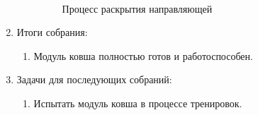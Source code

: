 \begin{enumerate}
\begin{enumerate}
\begin{figure}[H]
\begin{minipage}[h]{0.24\linewidth}
			\end{minipage}
			\caption{Процесс раскрытия направляющей}
		\end{figure}

	\end{enumerate}
	
	\item Итоги собрания:
	\begin{enumerate}
		
		\item Модуль ковша полностью готов и работоспособен.
		
	\end{enumerate}
	
	\item Задачи для последующих собраний:
	\begin{enumerate}
		
		\item Испытать модуль ковша в процессе тренировок.
			
	\end{enumerate}
\end{enumerate}
\fillpage
